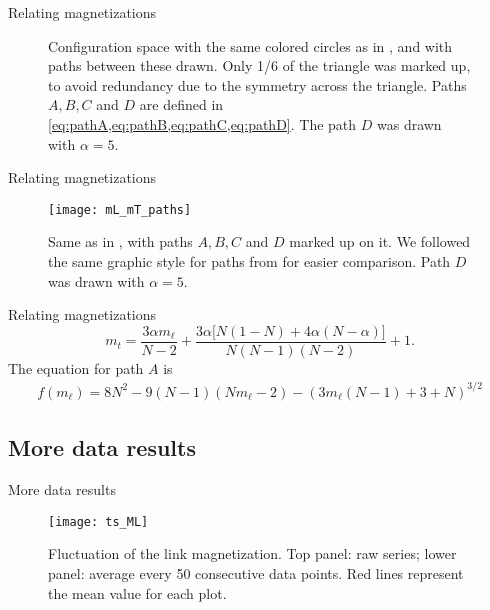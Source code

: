 \begin{frame}{Relating magnetizations}
\begin{figure}[!h]
    \centering
    \caption{Configuration space with the same colored circles as in , and with paths between these drawn. Only 1/6 of the triangle was marked up, to avoid redundancy due to the symmetry across the triangle. Paths $A, B, C$ and $D$ are defined in \cref{eq:pathA,eq:pathB,eq:pathC,eq:pathD}. The path $D$ was drawn with $\alpha = 5$.}
    \label{fig:ps_paths}
\end{figure}
\end{frame}

\begin{frame}{Relating magnetizations}
\begin{figure}
    \centering
    \texttt{[image: mL\_mT\_paths]}
    \caption{Same as in , with paths $A,B,C$ and $D$ marked up on it. We followed the same graphic style for paths from  for easier comparison. Path $D$ was drawn with $\alpha=5$.\label{fig:mL_mT_paths}}
\end{figure}
\end{frame}

\begin{frame}{Relating magnetizations}
\begin{equation}
    m_{t} =  \frac{3 \alpha m_{\ell}}{N - 2} + \frac{3\alpha\big[N(1-N)+4\alpha(N-\alpha)\big]}{N(N-1)(N-2)} + 1.
\label{eq:mT_of_mL}
\end{equation}
The equation for path $A$ is
\begin{equation}
    \begin{split}
        f(m_\ell) = 8N^2 - 9(N-1)(Nm_\ell -2)- (3m_\ell(N-1) + 3+N)^{3 / 2}
    \end{split}
    \label{eq:rs}
\end{equation}
\end{frame}

\subsection{More data results}

\begin{frame}{More data results}
\begin{figure}[h]
    \centering
	\texttt{[image: ts\_ML]}
    \caption{Fluctuation of the link magnetization. Top panel: raw series; lower panel: average every 50 consecutive data points. Red lines represent the mean value for each plot.}
    \label{fig:ts1}
\end{figure}
\end{frame}

